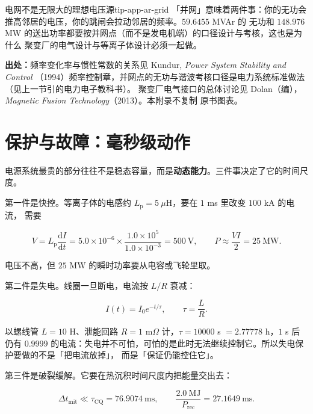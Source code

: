 \begin{tip}{电网不是无限大的理想电压源}{tip-app-ar-grid}
「并网」意味着两件事：你的无功会推高邻居的电压，你的跳闸会拉动邻居的频率。$59.6455$ MVAr 的
无功和 $148.976$ MW 的送出功率都要按并网点（而不是发电机端）的口径设计与考核，这也是为什么
聚变厂的电气设计与等离子体设计必须一起做。
\end{tip}

{\small

\textbf{出处：}频率变化率与惯性常数的关系见 Kundur, \emph{Power System Stability and Control}
（1994）频率控制章，并网点的无功与谐波考核口径是电力系统标准做法（见上一节引的电力电子教科书）。
聚变厂电气接口的总体讨论见 Dolan（编），\emph{Magnetic Fusion Technology}（2013）。本附录不复制
原书图表。
\section{保护与故障：毫秒级动作}
\label{sec:app-ar-protect}
}

电源系统最贵的部分往往不是稳态容量，而是\textbf{动态能力}。三件事决定了它的时间尺度。

第一件是快控。等离子体的电感约 $L_\mathrm{p}=5\ \mu$H，要在 $1$ ms 里改变 $100$ kA 的电流，
需要

\begin{equation}
V=L_\mathrm{p}\frac{\mathrm{d}I}{\mathrm{d}t}
=5.0\times10^{-6}\times\frac{1.0\times10^{5}}{1.0\times10^{-3}}=500\ \mathrm{V},
\qquad
P\approx\frac{VI}{2}=25\ \mathrm{MW}.
\label{eq:app-ar-fast}
\end{equation}

电压不高，但 $25$ MW 的瞬时功率要从电容或飞轮里取。

第二件是失电。线圈一旦断电，电流按 $L/R$ 衰减：

\begin{equation}
I(t)=I_0e^{-t/\tau},\qquad \tau=\frac{L}{R}.
\label{eq:app-ar-decay}
\end{equation}

以螺线管 $L=10$ H、泄能回路 $R=1$ m$\Omega$ 计，$\tau=10000$ s $=2.77778$ h，$1$ s 后仍有
$0.9999$ 的电流：失电并不可怕，可怕的是此时无法继续控制它。所以失电保护要做的不是「把电流放掉」，
而是「保证仍能控住它」。

第三件是破裂缓解。它要在热沉积时间尺度内把能量交出去：

\begin{equation}
\Delta t_\mathrm{mit}\ll\tau_\mathrm{CQ}=76.9074\ \mathrm{ms},
\qquad
\frac{2.0\ \mathrm{MJ}}{P_\mathrm{rec}}=27.1649\ \mathrm{ms}.
\label{eq:app-ar-mit}
\end{equation}

